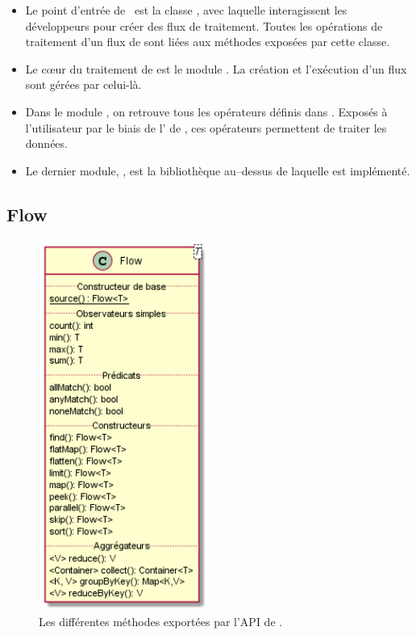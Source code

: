 \begin{itemize}

\item Le point d'entr\'ee de \ppff\ est la classe , avec laquelle interagissent les d\'eveloppeurs pour cr\'eer des flux de traitement. Toutes les op\'erations de traitement d'un flux de  sont li\'ees aux m\'ethodes expos\'ees par cette classe. 

\item Le c\oe{}ur du traitement de  est le module . La cr\'eation et l'ex\'ecution d'un flux sont g\'er\'ees par celui-l\`a. 

\item Dans le module , on retrouve tous les op\'erateurs d\'efinis dans . Expos\'es \`a l'utilisateur par le biais de l' de , ces op\'erateurs permettent de traiter les donn\'ees.

\item Le dernier module, , est la biblioth\`eque au–dessus de laquelle  est impl\'ement\'e.


\end{itemize}

\subsection{Flow}

\begin{figure}
\centering
     \includegraphics[width=0.5\textwidth]{Figures/flow.png}
      \caption{Les diff\'erentes m\'ethodes export\'ees par l'API de .}
       \label{Flow.fig}
\end{figure}

